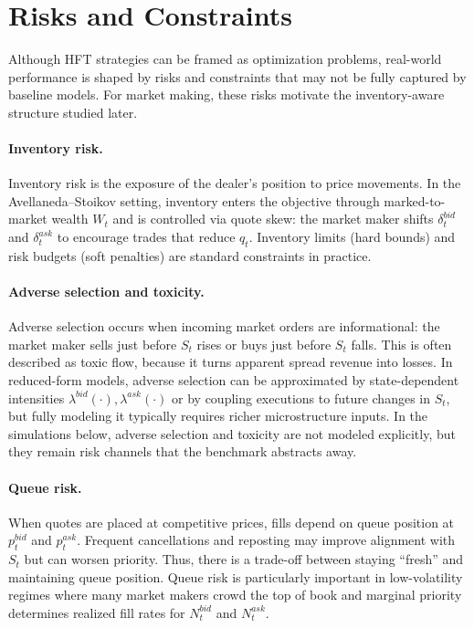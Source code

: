\documentclass[a4paper,10pt,titlepage,oneside,openany]{book}
\theoremstyle{plain}\newtheorem{theorem}{Theorem}[chapter]
\theoremstyle{definition}\newtheorem{definition}{Definition}[chapter]
\theoremstyle{remark}\newtheorem{remark}{Remark}[chapter]
\begin{document}
\section{Risks and Constraints}
Although HFT strategies can be framed as optimization problems, real-world performance is shaped by risks and constraints that may not be fully captured by baseline models. For market making, these risks motivate the inventory-aware structure studied later.

\paragraph{Inventory risk.}
Inventory risk is the exposure of the dealer's position to price movements. In the Avellaneda--Stoikov setting, inventory enters the objective through marked-to-market wealth $W_t$ and is controlled via quote skew: the market maker shifts $\delta_t^{bid}$ and $\delta_t^{ask}$ to encourage trades that reduce $q_t$. Inventory limits (hard bounds) and risk budgets (soft penalties) are standard constraints in practice.

\paragraph{Adverse selection and toxicity.}
Adverse selection occurs when incoming market orders are informational: the market maker sells just before $S_t$ rises or buys just before $S_t$ falls. This is often described as toxic flow, because it turns apparent spread revenue into losses. In reduced-form models, adverse selection can be approximated by state-dependent intensities $\lambda^{bid}(\cdot),\lambda^{ask}(\cdot)$ or by coupling executions to future changes in $S_t$, but fully modeling it typically requires richer microstructure inputs. In the simulations below, adverse selection and toxicity are not modeled explicitly, but they remain risk channels that the benchmark abstracts away.

\paragraph{Queue risk.}
When quotes are placed at competitive prices, fills depend on queue position at $p_t^{bid}$ and $p_t^{ask}$. Frequent cancellations and reposting may improve alignment with $S_t$ but can worsen priority. Thus, there is a trade-off between staying ``fresh'' and maintaining queue position. Queue risk is particularly important in low-volatility regimes where many market makers crowd the top of book and marginal priority determines realized fill rates for $N_t^{bid}$ and $N_t^{ask}$.
\end{document}
